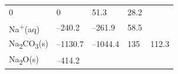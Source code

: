 \documentclass[
  9pt,
]{extbook}
\theoremstyle{definition}
\theoremstyle{definition}
\theoremstyle{definition}
\theoremstyle{remark}
\begin{document}
\begin{longtable}[]{@{}lllll@{}}
\begin{minipage}[t]{0.19\columnwidth}
0\strut
\end{minipage} & \begin{minipage}[t]{0.20\columnwidth}\raggedright
0\strut
\end{minipage} & \begin{minipage}[t]{0.18\columnwidth}\raggedright
51.3\strut
\end{minipage} & \begin{minipage}[t]{0.18\columnwidth}\raggedright
28.2\strut
\end{minipage}\tabularnewline
\begin{minipage}[t]{0.10\columnwidth}\raggedright
Na\textsuperscript{+}(aq)\strut
\end{minipage} & \begin{minipage}[t]{0.19\columnwidth}\raggedright
--240.2\strut
\end{minipage} & \begin{minipage}[t]{0.20\columnwidth}\raggedright
--261.9\strut
\end{minipage} & \begin{minipage}[t]{0.18\columnwidth}\raggedright
58.5\strut
\end{minipage} & \begin{minipage}[t]{0.18\columnwidth}\raggedright
\strut
\end{minipage}\tabularnewline
\begin{minipage}[t]{0.10\columnwidth}\raggedright
Na\textsubscript{2}CO\textsubscript{3}(s)\strut
\end{minipage} & \begin{minipage}[t]{0.19\columnwidth}\raggedright
--1130.7\strut
\end{minipage} & \begin{minipage}[t]{0.20\columnwidth}\raggedright
--1044.4\strut
\end{minipage} & \begin{minipage}[t]{0.18\columnwidth}\raggedright
135\strut
\end{minipage} & \begin{minipage}[t]{0.18\columnwidth}\raggedright
112.3\strut
\end{minipage}\tabularnewline
\begin{minipage}[t]{0.10\columnwidth}\raggedright
Na\textsubscript{2}O(s)\strut
\end{minipage} & \begin{minipage}[t]{0.19\columnwidth}\raggedright
--414.2\strut
\end{minipage} & \begin{minipage}[t]{0.20\columnwidth}\raggedright

\end{minipage}
\end{longtable}
\end{document}
